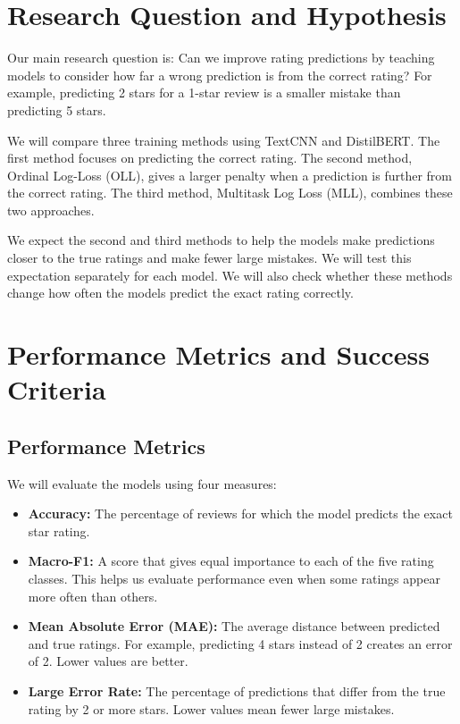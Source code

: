 \documentclass[conference,a4paper,9pt]{IEEEtran}
\begin{document}
\section{Research Question and Hypothesis}

Our main research question is: Can we improve rating predictions by teaching models to consider how far a wrong prediction is from the correct rating? For example, predicting 2 stars for a 1-star review is a smaller mistake than predicting 5 stars.

We will compare three training methods using TextCNN and DistilBERT. The first method focuses on predicting the correct rating. The second method, Ordinal Log-Loss (OLL), gives a larger penalty when a prediction is further from the correct rating. The third method, Multitask Log Loss (MLL), combines these two approaches.

We expect the second and third methods to help the models make predictions closer to the true ratings and make fewer large mistakes. We will test this expectation separately for each model. We will also check whether these methods change how often the models predict the exact rating correctly.

\section{Performance Metrics and Success Criteria}
\subsection{Performance Metrics}

We will evaluate the models using four measures:

\begin{itemize}
\item \textbf{Accuracy:} The percentage of reviews for which the model predicts the exact star rating.
\item \textbf{Macro-F1:} A score that gives equal importance to each of the five rating classes. This helps us evaluate performance even when some ratings appear more often than others.
\item \textbf{Mean Absolute Error (MAE):} The average distance between predicted and true ratings. For example, predicting 4 stars instead of 2 creates an error of 2. Lower values are better.
\item \textbf{Large Error Rate:} The percentage of predictions that differ from the true rating by 2 or more stars. Lower values mean fewer large mistakes.
\end{itemize}
\end{document}
